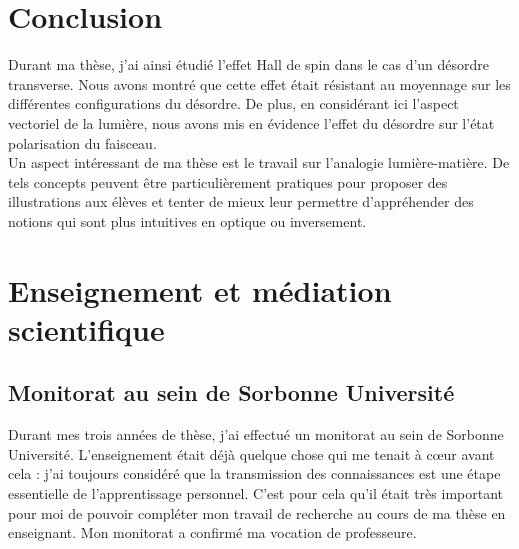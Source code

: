 \documentclass[a4paper,11pt]{article} %
\begin{document}
	
	\section{Conclusion}
	
	Durant ma thèse, j'ai ainsi étudié l'effet Hall de spin dans le cas d'un désordre transverse. Nous avons montré que cette effet était résistant au moyennage sur les différentes configurations du désordre. De plus, en considérant ici l'aspect vectoriel de la lumière, nous avons mis en évidence l'effet du désordre sur l'état polarisation du faisceau.\\
	
	Un aspect intéressant de ma thèse est le travail sur l'analogie lumière-matière. De tels concepts peuvent être particulièrement pratiques pour proposer des illustrations aux élèves et tenter de mieux leur permettre d'appréhender des notions qui sont plus intuitives en optique ou inversement.
	
	
	\section{Enseignement et médiation scientifique}
	\subsection{Monitorat au sein de Sorbonne Université}
	Durant mes trois années de thèse, j'ai effectué un monitorat au sein de Sorbonne Université. L'enseignement était déjà quelque chose qui me tenait à cœur avant cela : j'ai toujours considéré que la transmission des connaissances est une étape essentielle de l'apprentissage personnel. C'est pour cela qu'il était très important pour moi de pouvoir compléter mon travail de recherche au cours de ma thèse en enseignant. Mon monitorat a confirmé ma vocation de professeure.\\ 
	
\end{document}
